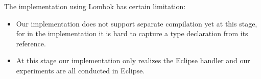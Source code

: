 The implementation using Lombok has certain limitation: 
\begin{itemize}
\item Our implementation does not support separate compilation yet at this
  stage, for in the implementation it is hard to capture a type declaration from
  its reference.
\item At this stage our implementation only realizes the Eclipse handler and our
  experiments are all conducted in Eclipse.
\end{itemize}
